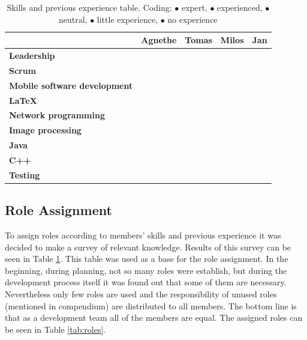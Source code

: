 \begin{table}\centering {}
    \caption[Skills and previous experience]{Skills and previous experience table. Coding:
        \textcolor{green!100}{$\bullet$} expert,
        \textcolor{green!60}{$\bullet$} experienced,
        \textcolor{yellow!75}{$\bullet$} neutral,
        \textcolor{orange!90}{$\bullet$} little experience,
        \textcolor{red!80}{$\bullet$} no experience}
    \label{tab:skills}
    \vspace{2mm}
    \begin{tabular}{lcccc}
    \toprule[0.5mm]
                                & Agnethe   & Tomas & Milos & Jan \\
    \midrule
    \textbf{Leadership                 } &  &  &  &  \\ 
    \textbf{Scrum                      } &  &  &  &  \\ 
    \textbf{Mobile software development} &  &  &  &  \\ 
    \textbf{\LaTeX                     } &  &  &  &  \\ 
    \textbf{Network programming        } &  &  &  &  \\ 
    \textbf{Image processing           } &  &  &  &  \\ 
    \textbf{Java                       } &  &  &  &  \\ 
    \textbf{C++                        } &  &  &  &  \\ 
    \textbf{Testing                    } &  &  &  &  \\
    \bottomrule[0.5mm]
    \end{tabular}
\end{table}

\subsection{Role Assignment}
To assign roles according to members' skills and previous experience it was decided to make a survey of relevant knowledge. 
Results of this survey can be seen in Table \ref{tab:skills}. 
This table was used as a base for the role assignment.
In the beginning, during planning, not so many roles were establish, but during the development process itself it was found out that some of them are necessary. 
Nevertheless only few roles are used and the responsibility of unused roles (mentioned in compendium) are distributed to all members. 
The bottom line is that as a development team all of the members are equal.
The assigned roles can be seen in Table \ref{tab:roles}. 

